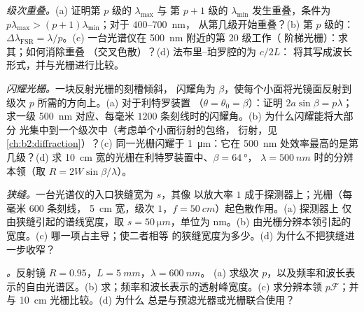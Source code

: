 \begin{exercise}[$\star\star$]\label{exo:b2:gratings:6}
\emph{级次重叠。}(a) 证明第 $p$ 级的 $\lambda_{\max}$ 与
第 $p + 1$ 级的 $\lambda_{\min}$ 发生重叠，条件为 $p\lambda_{\max} > (p + 1)\lambda_{\min}$；对于 $400$--\qty{700}{nm}，
从第几级开始重叠？(b) 第 $p$ 级的：$\Delta\lambda_{\text{FSR}}
= \lambda/p$。(c) 一台光谱仪在 \qty{500}{nm} 附近的第 $20$ 级工作（
阶梯光栅）：求其；如何消除重叠
（交叉色散）？(d) 法布里–珀罗腔的为 $c/2L$：
将其写成波长形式，并与光栅进行比较。
\end{exercise}

\begin{exercise}[$\star\star$]\label{exo:b2:gratings:7}
\emph{闪耀光栅。}一块反射光栅的刻槽倾斜，
闪耀角为 $\beta$，使每个小面将光镜面反射到
级次 $p$ 所需的方向上。(a) 对于利特罗装置
（$\theta = \theta_0 = \beta$）：证明 $2a\sin\beta = p\lambda$；求一级
\qty{500}{nm} 对应、每毫米 $1200$ 条刻线时的闪耀角。(b) 为什么闪耀能将大部分
光集中到一个级次中（考虑单个小面衍射的包络，
衍射，见\cref{ch:b2:diffraction}）？(c) 同一光栅闪耀于
\qty{1}{\micro m}：它在 \qty{500}{nm} 处效率最高的是第几级？(d)
求 \qty{10}{cm} 宽的光栅在利特罗装置中、$\beta = \qty{64}{\degree}$，
$\lambda = \qty{500}{nm}$ 时的分辨本领（取 $R = 2W\sin\beta/\lambda$）。
\end{exercise}

\begin{exercise}[$\star\star$]\label{exo:b2:gratings:8}
\emph{狭缝。}一台光谱仪的入口狭缝宽为 $s$，其像
以放大率 $1$ 成于探测器上；光栅（每毫米 $600$ 条刻线，
\qty{5}{cm} 宽，级次 $1$，$f = \qty{50}{cm}$）起色散作用。(a) 探测器上
仅由狭缝引起的谱线宽度，取 $s = \qty{50}{\micro m}$，单位为 nm。(b)
由光栅分辨本领引起的宽度。(c) 哪一项占主导；使二者相等
的狭缝宽度为多少。(d) 为什么不把狭缝进一步收窄？
\end{exercise}

\begin{exercise}[$\star\star$]\label{exo:b2:gratings:9}
\emph{。}反射镜 $R = 0.95$，$L = \qty{5}{mm}$，$\lambda = \qty{600}{nm}$。
(a) 求级次 $p$，以及频率和波长表示的自由光谱区。(b)
求；频率和波长表示的透射峰宽度。(c)
求分辨本领 $p\mathcal F$；并与 \qty{10}{cm} 光栅比较。(d) 为什么
总是与预滤光器或光栅联合使用？
\end{exercise}

